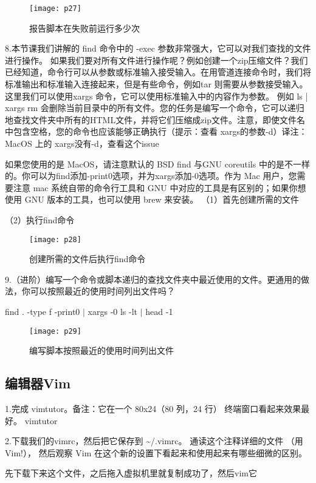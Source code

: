 \documentclass[a4paper ,12pt]{article}
\begin{document}
		\begin{figure}[h]
		\centering
		\texttt{[image: p27]}
		\caption{报告脚本在失败前运行多少次}
	\end{figure}
	
	8.本节课我们讲解的 find 命令中的 -exec 参数非常强大，它可以对我们查找的文件进行操作。 如果我们要对所有文件进行操作呢？例如创建一个zip压缩文件？我们已经知道，命令行可以从参数或标准输入接受输入。在用管道连接命令时，我们将标准输出和标准输入连接起来，但是有些命令，例如tar 则需要从参数接受输入。这里我们可以使用xargs 命令，它可以使用标准输入中的内容作为参数。 例如 ls | xargs rm 会删除当前目录中的所有文件。您的任务是编写一个命令，它可以递归地查找文件夹中所有的HTML文件，并将它们压缩成zip文件。注意，即使文件名中包含空格，您的命令也应该能够正确执行（提示：查看 xargs的参数-d）译注：MacOS 上的 xargs没有-d，查看这个issue
	
	如果您使用的是 MacOS，请注意默认的 BSD find 与GNU coreutils 中的是不一样的。你可以为find添加-print0选项，并为xargs添加-0选项。作为 Mac 用户，您需要注意 mac 系统自带的命令行工具和 GNU 中对应的工具是有区别的；如果你想使用 GNU 版本的工具，也可以使用 brew 来安装。
	（1）首先创建所需的文件
	
	（2）执行find命令
	
		\begin{figure}[h]
		\centering
		\texttt{[image: p28]}
		\caption{创建所需的文件后执行find命令}
	\end{figure}
	9.（进阶）编写一个命令或脚本递归的查找文件夹中最近使用的文件。更通用的做法，你可以按照最近的使用时间列出文件吗？
	
	find . -type f -print0 $|$ xargs -0 ls -lt $|$ head -1
    	\begin{figure}[h]
    	\centering
    	\texttt{[image: p29]}
    	\caption{编写脚本按照最近的使用时间列出文件}
    \end{figure}
	
	 \subsection{编辑器Vim}
	 1.完成 vimtutor。备注：它在一个 80x24（80 列，24 行） 终端窗口看起来效果最好。
	 vimtutor
	 
	 2.下载我们的vimrc，然后把它保存到 \~{}/.vimrc。 通读这个注释详细的文件 （用 Vim!）， 然后观察 Vim 在这个新的设置下看起来和使用起来有哪些细微的区别。
	 
	 先下载下来这个文件，之后拖入虚拟机里就复制成功了，然后vim它
	 
\end{document}
